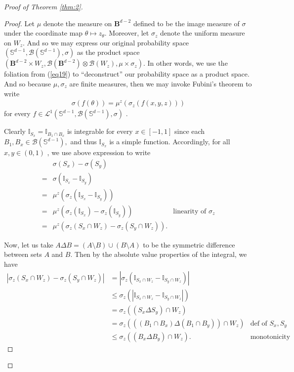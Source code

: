 \documentclass{article}
\begin{document}
\begin{proof}[Proof of Theorem \ref{thm:2}]
\begin{proof}
Let $\mu$ denote the measure on $\boldsymbol{B}^{d-2}$ defined to be the image measure of $\sigma$ under the coordinate map $\theta \mapsto z_{\theta}$. Moreover, let $\sigma_z$ denote the uniform measure on $W_z$. And so we may express our original probability space $(\mathbb{S}^{d-1}, \mathcal{B}(\mathbb{S}^{d-1}), \sigma)$ as the product space $(\boldsymbol{B}^{d-2} \times W_z, \mathcal{B}(\boldsymbol{B}^{d-2})\otimes\mathcal{B}(W_z), \mu \times \sigma_z)$. In other words, we use the foliation from (\ref{eq19}) to \enquote{deconstruct} our probability space as a product space. And so because $\mu, \sigma_z$ are finite measures, then we may invoke Fubini's theorem to write
\begin{align*}
    \sigma(f(\theta)) = \mu^z(\sigma_z(f(x, y, z)))
\end{align*}
for every $f \in \mathcal{L}^1(\mathbb{S}^{d-1}, \mathcal{B}(\mathbb{S}^{d-1}), \sigma)$ \cite{pollard_2001}. 

Clearly $\mathbb{I}_{S_x} = \mathbb{I}_{B_1 \cap B_x}$ is integrable for every $x \in [-1, 1]$ since each $B_1, B_x \in \mathcal{B}(\mathbb{S}^{d-1}),$ and thus $\mathbb{I}_{S_x}$ is a simple function. Accordingly, for all $x, y \in (0,1)$ , we use above expression to write
\begin{align}
    &\sigma(S_x) - \sigma(S_y) \nonumber\\ 
    =& \sigma(\mathbb{I}_{S_x} - \mathbb{I}_{S_y}) \nonumber\\
    =& \mu^z(\sigma_z(\mathbb{I}_{S_x} - \mathbb{I}_{S_y})) \nonumber\\
    =& \mu^z(\sigma_z(\mathbb{I}_{S_x}) - \sigma_z(\mathbb{I}_{S_y})) & \text{linearity of $\sigma_z$} \nonumber\\
    =& \mu^z(\sigma_z(S_x \cap W_z) - \sigma_z(S_y \cap W_z))\label{eq20}.
\end{align}

Now, let us take $A \Delta B = (A \setminus B) \cup (B \setminus A)$ to be the symmetric difference between sets $A$ and $B$. Then by the absolute value properties of the integral, we have
\begin{align}
\left|\sigma_z(S_x \cap W_z) - \sigma_z(S_y \cap W_z) \right| &= \left|\sigma_z(\mathbb{I}_{S_x \cap W_z} - \mathbb{I}_{S_y \cap W_z}) \right| \nonumber\\ 
&\leq \sigma_z \left( \left| \mathbb{I}_{S_x \cap W_z} - \mathbb{I}_{S_y \cap W_z} \right| \right) \nonumber\\ 
&= \sigma_z \left( (S_x \Delta S_y) \cap W_z \right) \nonumber\\
&= \sigma_z \left( ((B_1\cap B_x) \Delta (B_1\cap B_y)) \cap W_z \right) & \text{def of $S_x, S_y$} \nonumber\\
&\leq \sigma_z \left( (B_x \Delta B_y) \cap W_z \right)\label{eq21}. & \text{monotonicity}
\end{align}


\end{proof}
\end{proof}
\end{document}
